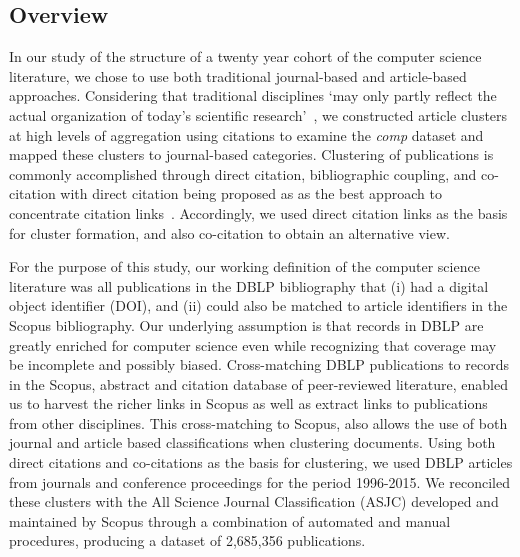  \subsection{Overview}
 In our study of the structure of a twenty year cohort of the computer science literature, we chose to use both traditional journal-based and article-based approaches. Considering that traditional disciplines `may only partly reflect the actual organization of today's scientific research'~\cite{waltman_new_2012}, we constructed article clusters at high levels of aggregation using citations to examine the \emph{comp} dataset and mapped these clusters to journal-based categories.
 Clustering of publications is commonly accomplished through direct citation, bibliographic coupling, and co-citation with direct citation being proposed as as the best approach to concentrate citation links~\cite{klavans_which_2017}. 
Accordingly, we used direct citation links as the basis for cluster formation, and also co-citation to obtain an alternative view.

For the purpose of this study, our working definition of the computer science literature was all publications in the DBLP bibliography that (i) had a digital object identifier (DOI), and (ii) could also be matched to article identifiers in the Scopus bibliography. 
Our underlying assumption is that records in DBLP are greatly enriched for computer science even while recognizing that coverage may be incomplete and possibly biased. Cross-matching DBLP publications to records in the Scopus, abstract and citation database of peer-reviewed literature, enabled us to harvest the richer links in Scopus as well as extract links to publications from other disciplines. This cross-matching to Scopus, also allows the use of both journal and article based classifications when clustering documents. Using both direct citations and co-citations as the basis for clustering, we used DBLP articles from journals and conference proceedings for the period 1996-2015. We reconciled these clusters with the All Science Journal Classification (ASJC) developed and maintained by Scopus through a combination of automated and manual procedures, producing a dataset of  2,685,356 publications.


